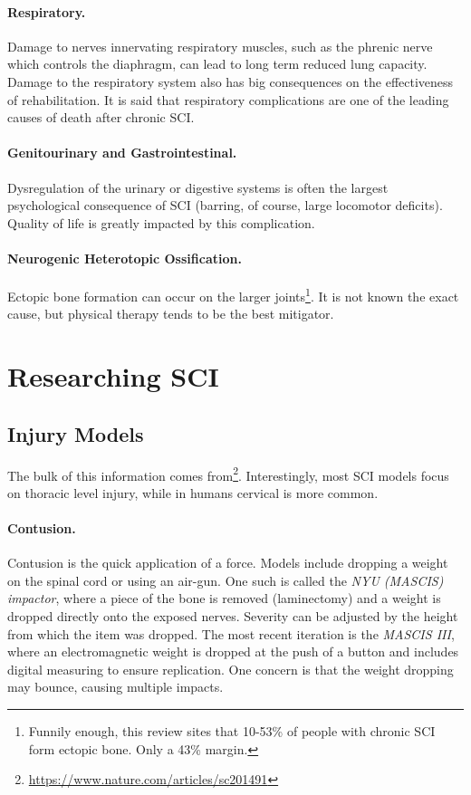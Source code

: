 \documentclass[12pt]{report}
\begin{document}
\subsubsection{Respiratory.}
Damage to nerves innervating respiratory muscles, such as the phrenic nerve which controls the diaphragm, can lead to long term reduced lung capacity. Damage to the respiratory system also has big consequences on the effectiveness of rehabilitation. It is said that respiratory complications are one of the leading causes of death after chronic SCI.

\subsubsection{Genitourinary and Gastrointestinal.}
Dysregulation of the urinary or digestive systems is often the largest psychological consequence of SCI (barring, of course, large locomotor deficits). Quality of life is greatly impacted by this complication. 

\subsubsection{Neurogenic Heterotopic Ossification.}
Ectopic bone formation can occur on the larger joints\footnote{Funnily enough, this review sites that 10-53\% of people with chronic SCI form ectopic bone. Only a 43\% margin.}. It is not known the exact cause, but physical therapy tends to be the best mitigator. 



\chapter{Researching SCI}
\section{Injury Models}
The bulk of this information comes from\footnote{\url{https://www.nature.com/articles/sc201491}}. Interestingly, most SCI models focus on thoracic level injury, while in humans cervical is more common. 

\subsubsection{Contusion.}
Contusion is the quick application of a force. Models include dropping a weight on the spinal cord or using an air-gun. One such is called the \textit{NYU (MASCIS) impactor}, where a piece of the bone is removed (laminectomy) and a weight is dropped directly onto the exposed nerves. Severity can be adjusted by the height from which the item was dropped. The most recent iteration is the \textit{MASCIS III}, where an electromagnetic weight is dropped at the push of a button and includes digital measuring to ensure replication. One concern is that the weight dropping may bounce, causing multiple impacts.\newline
\end{document}
